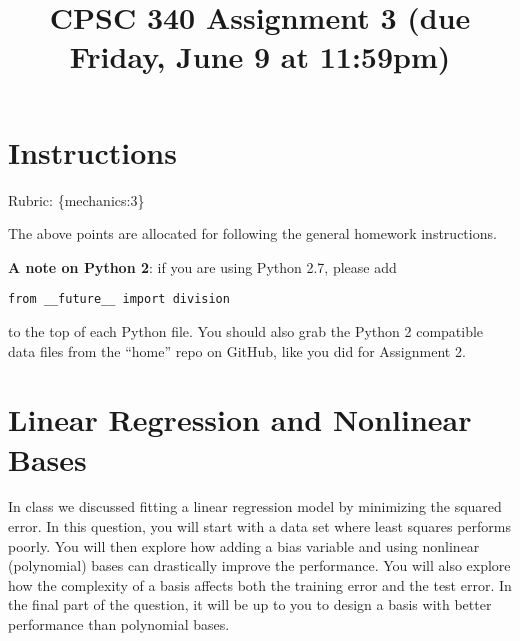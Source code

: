 \documentclass{article}
\begin{document}
\def\blu#1{{\color{blu}#1}}
\def\gre#1{{\color{gre}#1}}
\def\red#1{{\color{red}#1}}
\def\norm#1{\|#1\|}
\newcommand{\argmin}[1]{\mathop{\hbox{argmin}}_{#1}}
\newcommand{\argmax}[1]{\mathop{\hbox{argmax}}_{#1}}
\def\R{\mathbb{R}}
\newcommand{\fig}[2]{\texttt{[image: \#2]}}
\newcommand{\centerfig}[2]{\begin{center}\texttt{[image: \#2]}\end{center}}
\def\items#1{\begin{itemize}#1\end{itemize}}
\def\enum#1{\begin{enumerate}#1\end{enumerate}}
\newcommand{\code}[1]{}
\newcommand{\half}{\frac 1 2}
\def\argmax{\mathop{\rm arg\,max}}
\def\argmin{\mathop{\rm arg\,min}}
\def\rubric#1{\gre{Rubric: \{#1\}}}{}



\title{CPSC 340 Assignment 3 (due Friday, June 9 at 11:59pm)}
\date{}
\maketitle

\vspace{-7em}

\section*{Instructions}
\rubric{mechanics:3}

The above points are allocated for following the general homework instructions.

\vspace{1em}

\textbf{A note on Python 2}: if you are using Python 2.7, please add
\begin{verbatim}
from __future__ import division
\end{verbatim}
to the top of each Python file. You should also grab the Python 2 compatible data files from the ``home'' repo on GitHub, like you did for Assignment 2.


\section{Linear Regression and Nonlinear Bases}

In class we discussed fitting a linear regression model by minimizing the squared error.
In this question, you will start with a data set where least squares performs poorly.
You will then explore how adding a bias variable and using nonlinear (polynomial) bases can drastically improve the performance.
You will also explore how the complexity of a basis affects both the training error and the test error.
In the final part of the question, it will be up to you to design a basis with better performance than polynomial bases.
\end{document}
